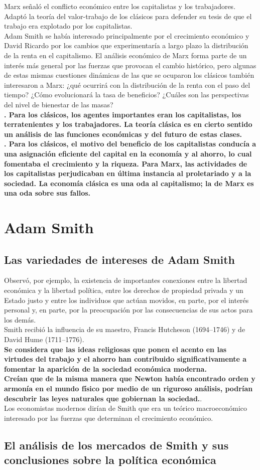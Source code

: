 \documentclass[10pt]{book}
\begin{document}
Marx señaló el conflicto económico entre los capitalistas y los trabajadores. Adaptó la teoría del valor-trabajo de los clásicos para defender su tesis de que el trabajo era explotado por los capitalistas.\\
Adam Smith se había interesado principalmente por el crecimiento económico y David Ricardo por los cambios que experimentaría a largo plazo la distribución de la renta en el capitalismo. El análisis económico de Marx forma parte de un interés más general por las fuerzas que provocan el cambio histórico, pero algunas de estas mismas cuestiones dinámicas de las que se ocuparon los clásicos también interesaron a Marx: ¿qué ocurrirá con la distribución de la renta con el paso del tiempo? ¿Cómo evolucionará la tasa de beneficios? ¿Cuáles son las perspectivas del nivel de bienestar de las masas?\\
\textbf{. Para los clásicos, los agentes importantes eran los capitalistas, los terratenientes y los trabajadores. La teoría clásica es en cierto sentido un análisis de las funciones económicas y del futuro de estas clases.\\
. Para los clásicos, el motivo del beneficio de los capitalistas conducía a una asignación eficiente del capital en la economía y al ahorro, lo cual fomentaba el crecimiento y la riqueza. Para Marx, las actividades de los capitalistas perjudicaban en última instancia al proletariado y a la sociedad. La economía clásica es una oda al capitalismo; la de Marx es una oda sobre sus fallos.}

\chapter{Adam Smith}
\section{Las variedades de intereses de Adam Smith}
Observó, por ejemplo, la existencia de importantes conexiones entre la libertad económica y la libertad política, entre los derechos de propiedad privada y un Estado justo y entre los individuos que actúan movidos, en parte, por el interés personal y, en parte, por la preocupación por las consecuencias de sus actos para los demás.\\
Smith recibió la influencia de su maestro, Francis Hutcheson (1694–1746) y de David Hume (1711–1776).\\
\textbf{ Se considera que las ideas religiosas que ponen el acento en las virtudes del trabajo y el ahorro han contribuido significativamente a fomentar la aparición de la sociedad económica moderna.}\\
\textbf{Creían que de la misma manera que Newton había encontrado orden y armonía en el mundo físico por medio de un riguroso análisis, podrían descubrir las leyes naturales que gobiernan la sociedad.}.\\
Los economistas modernos dirían de Smith que era un teórico macroeconómico interesado por las fuerzas que determinan el crecimiento económico.

\section{El análisis de los mercados de Smith y sus conclusiones sobre la política económica}
\end{document}
